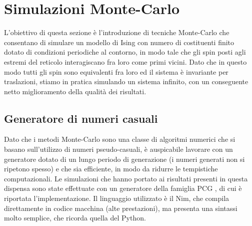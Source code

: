 \section{Simulazioni Monte-Carlo}

L'obiettivo di questa sezione è l'introduzione di tecniche Monte-Carlo che consentano di simulare un modello di Ising con 
numero di costituenti finito dotato di condizioni periodiche al contorno, in modo tale che gli spin posti agli estremi del reticolo  
interagiscano fra loro come primi vicini. Dato che in questo modo tutti gli spin sono equivalenti fra loro ed il sistema è invariante per 
traslazioni, stiamo in pratica simulando un sistema infinito, con un conseguente netto miglioramento della qualità dei risultati. 





\subsection{Generatore di numeri casuali}

Dato che i metodi Monte-Carlo sono una classe di algoritmi numerici che si basano sull'utilizzo di numeri pseudo-casuali, è auspicabile lavorare 
con un generatore dotato di un lungo periodo di generazione (i numeri generati non si ripetono spesso) e che sia efficiente, in modo da ridurre le 
tempistiche computazionali. Le simulazioni che hanno portato ai risultati presenti in questa dispensa sono state effettuate con un 
generatore della famiglia PCG \cite{pcg2014}, di cui è riportata l'implementazione. Il linguaggio utilizzato è il Nim, che compila 
direttamente in codice macchina (alte prestazioni), ma presenta una sintassi molto semplice, che ricorda quella del Python.


